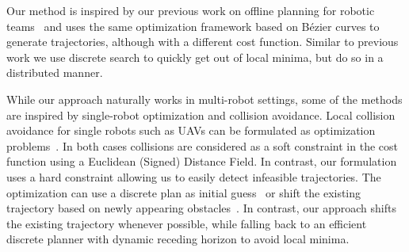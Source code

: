 \documentclass{svproc}
\begin{document}
Our method is inspired by our previous work on offline planning for robotic teams~\cite{crazyplanning-ieeetro} and uses the same optimization framework based on B\'ezier curves to generate trajectories, although with a different cost function.
Similar to previous work we use discrete search to quickly get out of local minima, but do so in a distributed manner.

While our approach naturally works in multi-robot settings, some of the methods are inspired by single-robot optimization and collision avoidance.
Local collision avoidance for single robots such as UAVs can be formulated as optimization problems~\cite{replanning-eth,replanning-usenko}.
In both cases collisions are considered as a soft constraint in the cost function using a Euclidean (Signed) Distance Field.
In contrast, our formulation uses a hard constraint allowing us to easily detect infeasible trajectories.
The optimization can use a discrete plan as initial guess~\cite{replanning-eth} or shift the existing trajectory based on newly appearing obstacles~\cite{replanning-usenko}.
In contrast, our approach shifts the existing trajectory whenever possible, while falling back to an efficient discrete planner with dynamic receding horizon to avoid local minima.




\end{document}
